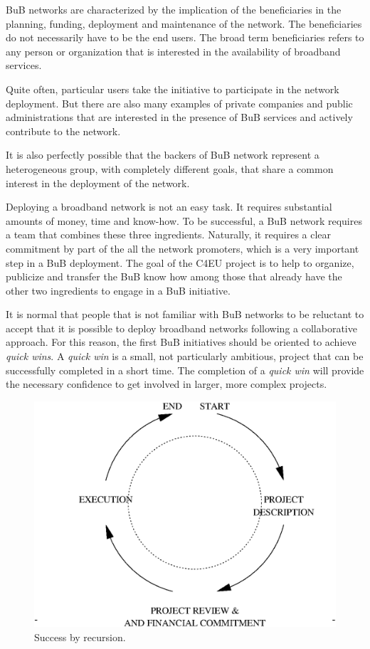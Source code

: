 \documentclass[conference]{IEEEtran}
\begin{document}
BuB networks are characterized by the implication of the beneficiaries in the planning, funding, deployment and maintenance of the network.
The beneficiaries do not necessarily have to be the end users.
The broad term beneficiaries refers to any person or organization that is interested in the availability of broadband services.

Quite often, particular users take the initiative to participate in the network deployment.
But there are also many examples of private companies and public administrations that are interested in the presence of BuB services and actively contribute to the network.

It is also perfectly possible that the backers of BuB network represent a heterogeneous group, with completely different goals, that share a common interest in the deployment of the network.

Deploying a broadband network is not an easy task.
It requires substantial amounts of money, time and know-how.
To be successful, a BuB network requires a team that combines these three ingredients.
Naturally, it requires a clear commitment by part of the all the network promoters, which is a very important step in a BuB deployment.
The goal of the C4EU project is to help to organize, publicize and transfer the  BuB know how among those that already have the other two ingredients to engage in a BuB initiative.

It is normal that people that is not familiar with BuB networks to be reluctant to accept that it is possible to deploy broadband networks following a collaborative approach.
For this reason, the first BuB initiatives should be oriented to achieve \emph{quick wins}.
A \emph{quick win} is a small, not particularly ambitious, project that can be successfully completed in a short time.
The completion of a \emph{quick win} will provide the necessary confidence to get involved in larger, more complex projects.

\begin{figure}[!t]
\centering
\includegraphics[width=\linewidth]{success_wheel}
\caption{Success by recursion.}
\label{fig:success_wheel}
\end{figure}
\end{document}
